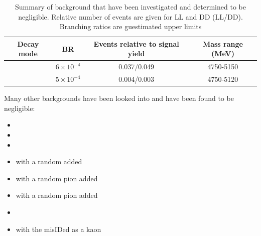 \begin{table}[h]
\centering
\begin{tabular}{cccc}
\hline
Decay mode & BR & Events relative to signal yield & Mass range (MeV) \\
\hline
\decay{\Bm}{\Dz\Kstarm\piz} & $6 \times 10^{-4}$ & 0.037/0.049 & 4750-5150 \\
\decay{\Bs}{\Dz\KS\pi\pi} & $5 \times 10^{-4}$ & 0.004/0.003 & 4750-5120 \\
\hline
\end{tabular}
\caption{Summary of background that have been investigated and determined to be negligible. Relative number of events are given for LL and DD (LL/DD). Branching ratios are guestimated upper limits}
\label{ignoredbackgrounds}
\end{table}


Many other backgrounds have been looked into and have been found to be negligible:

\begin{itemize}
\item \decay{\Bs}{\Dzb\Kstarz(\Kstarp[\pim])}
\item \decay{\Bs}{\Dstarp\Kstarp}
\item \decay{\Bs}{\Dspm(\kaon\kaon\pi)\Kstarpm}
\item \decay{\Bu}{\D\pi} with a random \KS added
\item \decay{\Bd}{\D\KS} with a  random pion added
\item \decay{\Bs}{\D\KS} with a random pion added
\item \decay{\Bu}{\D(\KS\pi\pi)\Kp}
\item {} with the \proton misIDed as a kaon
\end{itemize}

\clearpage
